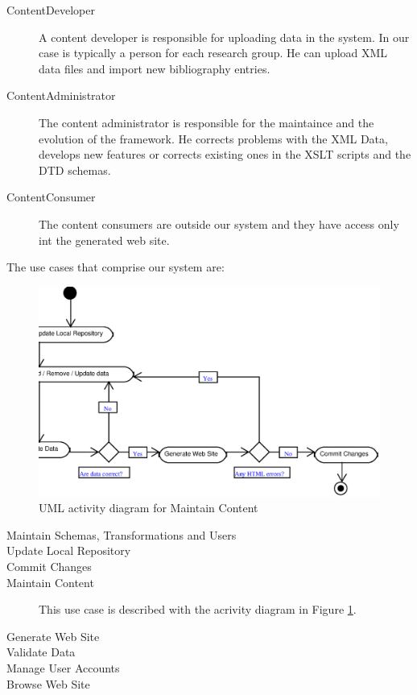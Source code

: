 \documentclass[10pt]{article}
\begin{document}
\begin{description}
\item[ContentDeveloper] A content developer is responsible for uploading data in the system. In our case is typically a person for each research group. He can upload XML data files and import new bibliography entries.

\item[ContentAdministrator] The content administrator is responsible for the maintaince and the evolution of the framework. He corrects problems with the XML Data, develops new features or corrects existing ones in the XSLT scripts and the DTD schemas.

\item[ContentConsumer] The content consumers are outside our system and they have access only int the generated web site.
\end{description}

The use cases that comprise our system are:

\begin{figure}
\includegraphics[scale=0.5]{maintain-content-activity}
\caption{UML activity diagram for Maintain Content}
\label{fig:maintain-content-diagram}
\end{figure}

\begin{description}
\item[Maintain Schemas, Transformations and Users]

\item[Update Local Repository]

\item[Commit Changes]

\item[Maintain Content] This use case is described with the acrivity diagram in Figure \ref{fig:maintain-content-diagram}.

\item[Generate Web Site]

\item[Validate Data]

\item[Manage User Accounts]

\item[Browse Web Site]

\end{description}
\end{document}
